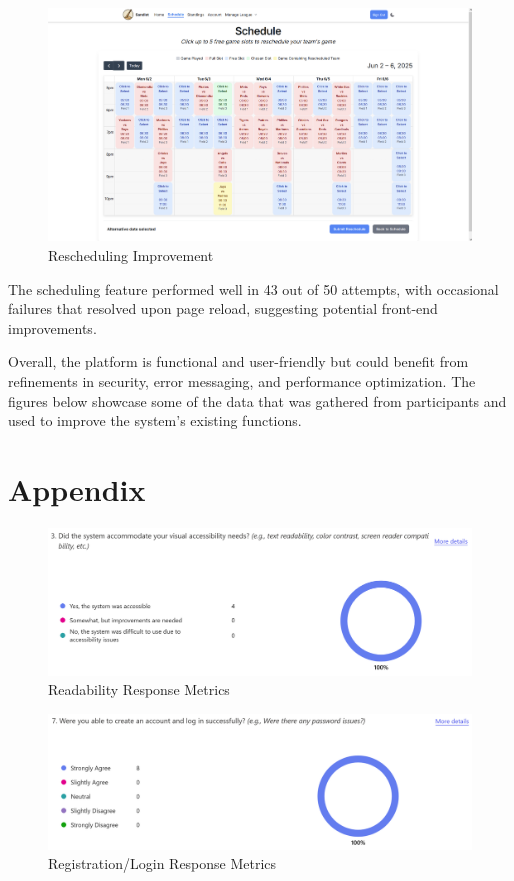 \documentclass{article}
\begin{document}
    \begin{figure}[H]
    \centering
    \includegraphics[scale=0.6]{rescheduling_improvement.png}
    \caption{Rescheduling Improvement}
    \label{rescheduling}
    \end{figure}
    
    The scheduling
    feature performed well in 43 out of 50 attempts, with occasional failures that
    resolved upon page reload, suggesting potential front-end improvements.

    Overall, the platform is functional and user-friendly but could benefit from
    refinements in security, error messaging, and performance optimization.
    The figures below showcase some of the data that was gathered from
    participants and used to improve the system's existing functions.

\section{Appendix}
    
    \begin{figure}[H]
    \centering
    \includegraphics[scale=0.6]{survey_responses_visual.png}
    \caption{Readability Response Metrics}
    \label{visual}
    \end{figure}
    
    \begin{figure}[H]
    \centering
    \includegraphics[scale=0.6]{survey_responses_register_signin.png}
    \caption{Registration/Login Response Metrics}
    \label{account}
    \end{figure}
\end{document}
